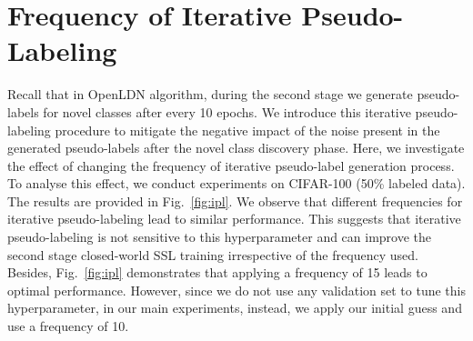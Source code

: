 \documentclass[runningheads]{eccv2022submission}
\begin{document}
\begin{figure*}
\captionsetup[subfloat]{labelformat=empty}
\centering
\vspace{-4mm}
    \caption{The effect of changing the frequency of iterative pseudo-labeling on final accuracy. These graphs demonstrate classification accuracies on known/novel/all classes for \textbf{CIFAR-100} dataset.} 
    
    \label{fig:ipl}
\end{figure*}




\section{Frequency of Iterative Pseudo-Labeling}
\label{sec:ipl}

Recall that in OpenLDN algorithm, during the second stage we generate pseudo-labels for novel classes after every 10 epochs. We introduce this iterative pseudo-labeling procedure to mitigate the negative impact of the noise present in the generated pseudo-labels after the novel class discovery phase. Here, we investigate the effect of changing the frequency of iterative pseudo-label generation process. To analyse this effect, we conduct experiments on CIFAR-100 (50\% labeled data). The results are provided in Fig.~\ref{fig:ipl}. We observe that different frequencies for iterative pseudo-labeling lead to similar performance. This suggests that iterative pseudo-labeling is not sensitive to this hyperparameter and can improve the second stage closed-world SSL training irrespective of the frequency used. Besides, Fig.~\ref{fig:ipl} demonstrates that applying a frequency of 15 leads to optimal performance. However, since we do not use any validation set to tune this hyperparameter, in our main experiments, instead, we apply our initial guess and use a frequency of 10.   

\clearpage


\end{document}
